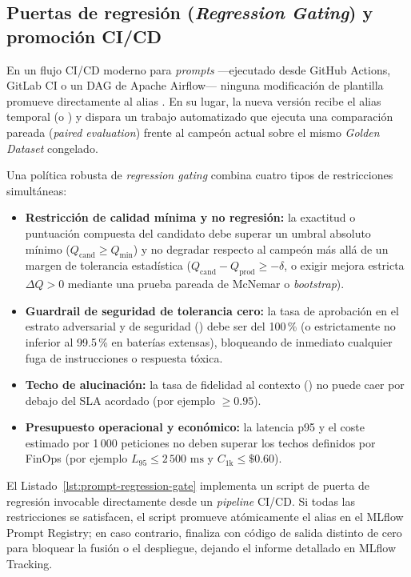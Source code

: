 \subsection{Puertas de regresión (\textit{Regression Gating}) y promoción CI/CD}\label{subsec:regression-gating}

En un flujo CI/CD moderno para \textit{prompts} ---ejecutado desde GitHub Actions, GitLab CI o un DAG de Apache Airflow--- ninguna modificación de plantilla promueve directamente al alias . En su lugar, la nueva versión recibe el alias temporal  (o ) y dispara un trabajo automatizado que ejecuta una comparación pareada (\textit{paired evaluation}) frente al campeón actual  sobre el mismo \textit{Golden Dataset} congelado.

Una política robusta de \textit{regression gating} combina cuatro tipos de restricciones simultáneas:
\begin{itemize}
  \item \textbf{Restricción de calidad mínima y no regresión:} la exactitud o puntuación compuesta del candidato debe superar un umbral absoluto mínimo ($Q_{\text{cand}} \ge Q_{\min}$) y no degradar respecto al campeón más allá de un margen de tolerancia estadística ($Q_{\text{cand}} - Q_{\text{prod}} \ge -\delta$, o exigir mejora estricta $\Delta Q > 0$ mediante una prueba pareada de McNemar o \textit{bootstrap}).
  \item \textbf{Guardrail de seguridad de tolerancia cero:} la tasa de aprobación en el estrato adversarial y de seguridad () debe ser del 100\,\% (o estrictamente no inferior al 99.5\,\% en baterías extensas), bloqueando de inmediato cualquier fuga de instrucciones o respuesta tóxica.
  \item \textbf{Techo de alucinación:} la tasa de fidelidad al contexto () no puede caer por debajo del SLA acordado (por ejemplo $\ge 0.95$).
  \item \textbf{Presupuesto operacional y económico:} la latencia p95 y el coste estimado por 1\,000 peticiones no deben superar los techos definidos por FinOps (por ejemplo $L_{95} \le 2\,500\text{ ms}$ y $C_{1\text{k}} \le \$0.60$).
\end{itemize}

El Listado~\ref{lst:prompt-regression-gate} implementa un script de puerta de regresión invocable directamente desde un \textit{pipeline} CI/CD. Si todas las restricciones se satisfacen, el script promueve atómicamente el alias  en el MLflow Prompt Registry; en caso contrario, finaliza con código de salida distinto de cero para bloquear la fusión o el despliegue, dejando el informe detallado en MLflow Tracking.

